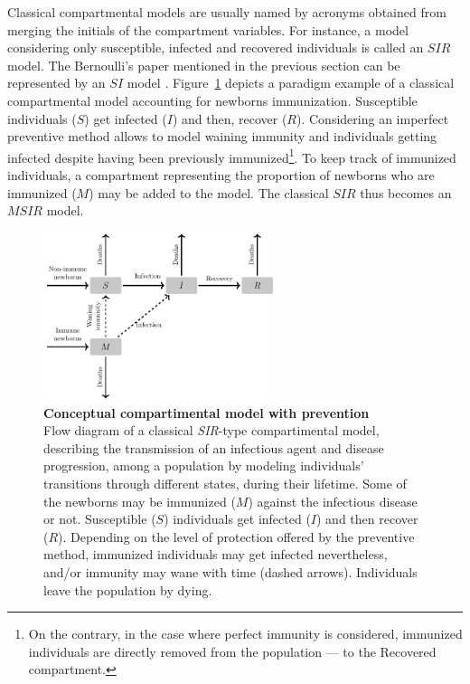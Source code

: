Classical compartmental models are usually named by acronyms obtained from merging the initials of the compartment variables. For instance, a model considering only susceptible, infected and recovered individuals is called an $SIR$ model. The Bernoulli's paper mentioned in the previous section can be represented by an $SI$ model \cite[]{Dietz2002}. Figure~\ref{fig:Intro_MSIR} depicts a paradigm example of a classical compartmental model accounting for newborns immunization. Susceptible individuals ($S$) get infected ($I$) and then, recover ($R$). Considering an imperfect preventive method allows to model waining immunity and individuals getting infected despite having been previously immunized\footnote{On the contrary, in the case where perfect immunity is considered, immunized individuals are directly removed from the population --- to the Recovered compartment.}. To keep track of immunized individuals, a compartment representing the proportion of newborns who are immunized ($M$) may be added to the model. The classical $SIR$ thus becomes an $MSIR$ model.

\begin{figure}[H]
	\centering	
	\includegraphics[width=0.6\textwidth]{Figures/Intro/TikZ_MSIR/MSIR_FlowDiagram}
	\caption[ Conceptual compartimental model with prevention]{%
		{\bf Conceptual compartimental model with prevention}\\
	Flow diagram of a classical \textit{SIR}-type compartimental model, describing the transmission of an infectious agent  and disease progression, among a population by modeling individuals' transitions through different states, during their lifetime. Some of the newborns may be immunized ($M$) against the infectious disease or not. Susceptible ($S$) individuals get infected ($I$) and then recover ($R$). Depending on the level of protection offered by the preventive method, immunized individuals may get infected nevertheless, and/or immunity may wane with time (dashed arrows). Individuals leave the population by dying.}
	\label{fig:Intro_MSIR}
\end{figure}
 
